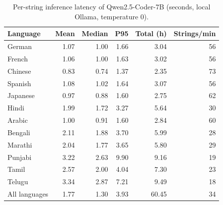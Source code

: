 \begin{table}[t]
\centering
\caption{Per-string inference latency of Qwen2.5-Coder-7B (seconds, local Ollama, temperature 0).\label{tab:latency}}
\begin{tabular}{lrrrrr}
\toprule
Language & Mean & Median & P95 & Total (h) & Strings/min \\
\midrule
German & 1.07 & 1.00 & 1.66 & 3.04 & 56 \\
French & 1.06 & 1.00 & 1.63 & 3.02 & 56 \\
Chinese & 0.83 & 0.74 & 1.37 & 2.35 & 73 \\
Spanish & 1.08 & 1.02 & 1.64 & 3.07 & 56 \\
Japanese & 0.97 & 0.88 & 1.60 & 2.75 & 62 \\
Hindi & 1.99 & 1.72 & 3.27 & 5.64 & 30 \\
Arabic & 1.00 & 0.91 & 1.60 & 2.84 & 60 \\
Bengali & 2.11 & 1.88 & 3.70 & 5.99 & 28 \\
Marathi & 2.04 & 1.77 & 3.65 & 5.80 & 29 \\
Punjabi & 3.22 & 2.63 & 9.90 & 9.16 & 19 \\
Tamil & 2.57 & 2.00 & 4.04 & 7.30 & 23 \\
Telugu & 3.34 & 2.87 & 7.21 & 9.49 & 18 \\
All languages & 1.77 & 1.30 & 3.93 & 60.45 & 34 \\
\bottomrule
\end{tabular}
\end{table}
